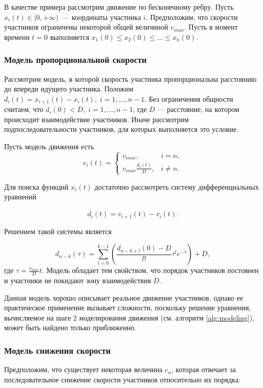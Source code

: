 \documentclass[12pt, a4paper]{article}
\begin{document}
В качестве примера рассмотрим движение по бесконечному ребру. Пусть ${x_i(t) \in [0, +\infty)}$~--- координаты участника $i$. Предположим, что скорости участников ограничены некоторой общей величиной $v_{max}$. Пусть в момент времени ${t = 0}$ выполняется $x_1(0) \le x_2(0) \le \dots \le x_n(0)$.

\subsubsection*{Модель пропорциональной скорости}
Рассмотрим модель, в которой скорость участника пропорциональна расстоянию до впереди идущего участника.
Положим $d_{i} (t) = x_{i + 1} (t) - x_{i} (t), \; i = 1, \dots, n - 1$.
Без ограничения общности считаем, что $d_{i} (0) < D, \; i = 1, \dots, n - 1$, где $D$ --- расстояние, на котором происходит взаимодействие участников. Иначе рассмотрим подпоследовательности участников, для которых выполняется это условие.

Пусть модель движения есть
\begin{equation}
	\label{eq:micro}
	v_i(t)=
	\begin{cases}
		v_{max}, & i = n,
		\\
		v_{max} \frac{d_i(t)}{D} ,& i \ne n.
	\end{cases}
\end{equation}

Для поиска функций $x_i(t)$ достаточно рассмотреть систему дифференциальных уравнений

$$ \dot{d_i} (t) = v_{i + 1} (t) - v_i (t).$$

Решением такой системы является

$$d_{n - k} (\tau) = \sum \limits_{l = 0} ^ {k - 1} \left(\frac{d_{n - k + l} (0) - D}{l!} \tau^l e ^ {-\tau}\right) + D ,$$
где ${\tau = \frac{v_{max}}{D}t}$. Модель обладает тем свойством, что порядок участников постоянен и участники не покидают зону взаимодействия $D$. 

Данная модель хорошо описывает реальное движение участников, однако ее практическое применение вызывает сложности, поскольку решение уравнения, вычисляемое на шаге 2 моделирования движения (см. алгоритм \ref{alg:modeling}), может быть найдено только приближенно.

\subsubsection*{Модель снижения скорости}

Предположим, что существует некоторая величина $c_n$, которая отвечает за последовательное снижение скорости участников относительно их порядка:
\end{document}
